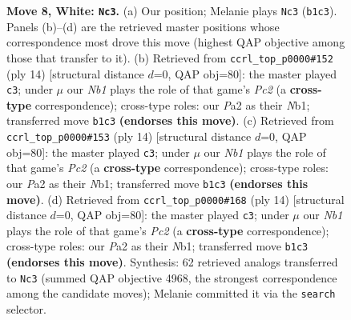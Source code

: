 \documentclass[11pt]{article}
\begin{document}
\begin{figure}[p]
\caption{\textbf{Move 8, White: \texttt{Nc3}.} (a) Our position; Melanie plays \texttt{Nc3} (\texttt{b1c3}). Panels (b)--(d) are the retrieved master positions whose correspondence most drove this move (highest QAP objective among those that transfer to it). (b) Retrieved from \texttt{ccrl\_top\_p0000\#152} (ply 14) [structural distance $d$=0, QAP obj=80]: the master played \texttt{c3}; under $\mu$ our \emph{Nb1} plays the role of that game's \emph{Pc2} (a \textbf{cross-type} correspondence); cross-type roles: our \emph{P}a2 as their \emph{N}b1; transferred move \texttt{b1c3} \textbf{(endorses this move)}. (c) Retrieved from \texttt{ccrl\_top\_p0000\#153} (ply 14) [structural distance $d$=0, QAP obj=80]: the master played \texttt{c3}; under $\mu$ our \emph{Nb1} plays the role of that game's \emph{Pc2} (a \textbf{cross-type} correspondence); cross-type roles: our \emph{P}a2 as their \emph{N}b1; transferred move \texttt{b1c3} \textbf{(endorses this move)}. (d) Retrieved from \texttt{ccrl\_top\_p0000\#168} (ply 14) [structural distance $d$=0, QAP obj=80]: the master played \texttt{c3}; under $\mu$ our \emph{Nb1} plays the role of that game's \emph{Pc2} (a \textbf{cross-type} correspondence); cross-type roles: our \emph{P}a2 as their \emph{N}b1; transferred move \texttt{b1c3} \textbf{(endorses this move)}. Synthesis: 62 retrieved analogs transferred to \texttt{Nc3} (summed QAP objective 4968, the strongest correspondence among the candidate moves); Melanie committed it via the \texttt{search} selector.}
\label{fig:thought-m14}
\end{figure}

\clearpage
\end{document}
